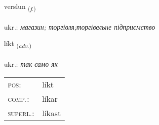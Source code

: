 \documentclass[frontgrid, backgrid]{flacards}\usepackage[]{graphicx}\usepackage[]{xcolor}
\begin{document}
\renewcommand{\flhead}{\vskip5pt \fboxsep=0pt {\small\bfseries\footnotesize Nafnorð | іменник}}
\renewcommand{\fcfoot}{\vskip5pt \fboxsep=0pt \hspace{2pt}{\small\bfseries\footnotesize 1K}}

\renewcommand{\blhead}{\vskip5pt {\small\bfseries\footnotesize Nafnorð | іменник }}
\renewcommand{\bcfoot}{\vskip5pt \hspace{2pt}{\small\bfseries\footnotesize 1K}}


{verslun \small{\textsubscript{(\textit{f.})}} \\[1ex] %
 \\
ukr.: \emph{магазин; торгівля;торгівельне підприємство} \\  [2ex]
\renewcommand*{\arraystretch}{0.8}
}

\renewcommand{\flhead}{\vskip5pt \fboxsep=0pt {\small\bfseries\footnotesize Atviksorð | прислівник}}
\renewcommand{\fcfoot}{\vskip5pt \fboxsep=0pt \hspace{2pt}{\small\bfseries\footnotesize 1K}}

\renewcommand{\blhead}{\vskip5pt {\small\bfseries\footnotesize Atviksorð | прислівник }}
\renewcommand{\bcfoot}{\vskip5pt \hspace{2pt}{\small\bfseries\footnotesize 1K}}


{líkt \small{\textsubscript{(\textit{adv.})}} \\[1ex] %
\textphonetic{[lixt]} \\
ukr.: \emph{так само як} \\  [2ex]
\renewcommand*{\arraystretch}{0.8}
\begin{tabular}{ll}
\textsc{pos}: & líkt \\ 
\textsc{comp.}: & líkar \\ 
\textsc{superl.}: & líkast \\
\end{tabular}
}
\end{document}
